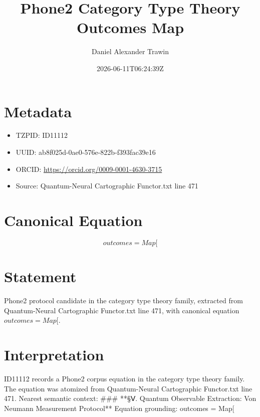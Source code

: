 \documentclass[11pt]{article}
\title{Phone2 Category Type Theory Outcomes Map}
\author{Daniel Alexander Trawin}
\date{2026-06-11T06:24:39Z}
\begin{document}
\maketitle
\section*{Metadata}
\begin{itemize}
\item TZPID: ID11112
\item UUID: ab8f025d-0ae0-576e-822b-f393fac39e16
\item ORCID: \url{https://orcid.org/0009-0001-4630-3715}
\item Source: Quantum-Neural Cartographic Functor.txt line 471
\end{itemize}
\section*{Canonical Equation}
\[
outcomes = Map[
\]
\section*{Statement}
Phone2 protocol candidate in the category type theory family, extracted from Quantum-Neural Cartographic Functor.txt line 471, with canonical equation $outcomes = Map[$.
\section*{Interpretation}
ID11112 records a Phone2 corpus equation in the category type theory family. The equation was atomized from Quantum-Neural Cartographic Functor.txt line 471. Nearest semantic context: ### **§Ⅴ. Quantum Observable Extraction: Von Neumann Measurement Protocol** Equation grounding: outcomes = Map[
\end{document}
